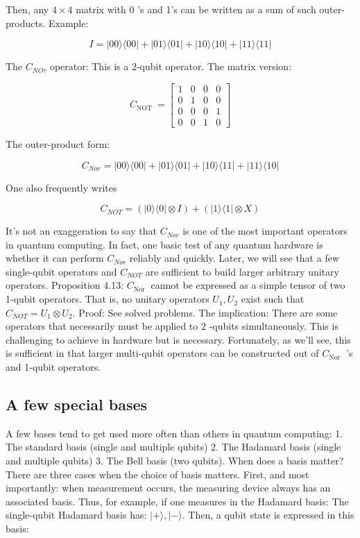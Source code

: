 \documentclass[main.tex]{subfiles}
\begin{document}
    Then, any $4 \times 4$ matrix with 0 's and 1's can be written as a sum of such outer-products. Example:
    
    $$
    I=|00\rangle\langle 00|+| 01\rangle\langle 01|+| 10\rangle\langle 10|+| 11\rangle\langle 11|
    $$
    
    The $C_{N O \tau}$ operator: This is a 2-qubit operator. The matrix version:
    
    $$
    C_{\text {NOT }}=\left[\begin{array}{llll}
    1 & 0 & 0 & 0 \\
    0 & 1 & 0 & 0 \\
    0 & 0 & 0 & 1 \\
    0 & 0 & 1 & 0
    \end{array}\right]
    $$
    
    The outer-product form:
    
    $$
    C_{N o r}=|00\rangle\langle 00|+| 01\rangle\langle 01|+| 10\rangle\langle 11|+| 11\rangle\langle 10|
    $$
    
    One also frequently writes
    
    $$
    C_{N O T}=(|0\rangle\langle 0| \otimes I)+(|1\rangle\langle 1| \otimes X)
    $$
    
    It's not an exaggeration to say that $C_{N o r}$ is one of the most important operators in quantum computing. In fact, one basic test of any quantum hardware is whether it can perform $C_{N o r}$ reliably and quickly. Later, we will see that a few single-qubit operators and $C_{N O T}$ are sufficient to build larger arbitrary unitary operators. Proposition 4.13:
    $C_{\text {Nor }}$ cannot be expressed as a simple tensor of two 1-qubit operators. That is, no unitary operators $U_{1}, U_{2}$ exist such that $C_{N O T}=U_{1} \otimes U_{2}$. Proof: See solved problems. The implication: There are some operators that necessarily must be applied to 2 -qubits simultaneously. This is challenging to achieve in hardware but is necessary. Fortunately, as we'll see, this is sufficient in that larger multi-qubit operators can be constructed out of $C_{\text {Nor }}$ 's and 1-qubit operators.

\subsection{A few special bases}

    A few bases tend to get used more often than others in quantum computing: 1. The standard basis (single and multiple qubits) 2. The Hadamard basis (single and multiple qubits) 3. The Bell basis (two qubits). When does a basis matter? There are three cases when the choice of basis matters. First, and most importantly: when measurement occurs, the measuring device always has an associated basis. Thus, for example, if one measures in the Hadamard basis: The single-qubit Hadamard basis has: $|+\rangle,|-\rangle$. Then, a qubit state is expressed in this basis:
    
\end{document}
